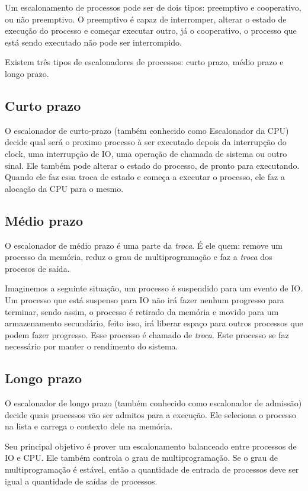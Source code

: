 \documentclass[times, 10pt,twocolumn]{article}
\begin{document}
    Um escalonamento de processos pode ser de dois tipos: preemptivo e cooperativo, ou não preemptivo. O preemptivo é capaz de interromper, alterar o estado de execução do processo e começar executar outro, já o cooperativo, o processo que está sendo executado não pode ser interrompido.\cite{rutgers}
    
    Existem três tipos de escalonadores de processos: curto prazo, médio prazo e longo prazo.
\subsection{Curto prazo}
    O escalonador de curto-prazo (também conhecido como Escalonador da CPU) decide qual será o proximo processo à ser executado depois da interrupção do clock, uma interrupção de IO, uma operação de chamada de sistema ou outro sinal.\cite{wiki} Ele também pode alterar o estado do processo, de pronto para executando. Quando ele faz essa troca de estado e começa a executar o processo, ele faz a alocação da CPU para o mesmo.
\subsection{Médio prazo}
    O escalonador de médio prazo é uma parte da \emph{troca}. É ele quem: remove um processo da memória, reduz o grau de multiprogramação e faz a \emph{troca} dos procesos de saída.
    
    Imaginemos a seguinte situação, um processo é suspendido para um evento de IO. Um processo que está suspenso para IO não irá fazer nenhum progresso para terminar, sendo assim, o processo é retirado da memória e movido para um armazenamento secundário, feito isso, irá liberar espaço para outros processos que podem fazer progresso. Esse processo é chamado de \emph{troca}.\cite{tutorialspoint} Este processo se faz necessário por manter o rendimento do sistema.

\subsection{Longo prazo}
    O escalonador de longo prazo (também conhecido como escalonador de admissão) decide quais processos vão ser admitos para a execução. Ele seleciona o processo na lista e carrega o contexto dele na memória.
    
    Seu principal objetivo é prover um escalonamento balanceado entre processos de IO e CPU. Ele também controla o grau de multiprogramação. Se o grau de multiprogramação é estável, então a quantidade de entrada de processos deve ser igual a quantidade de saídas de processos.\cite{tutorialspoint}
    
\end{document}
